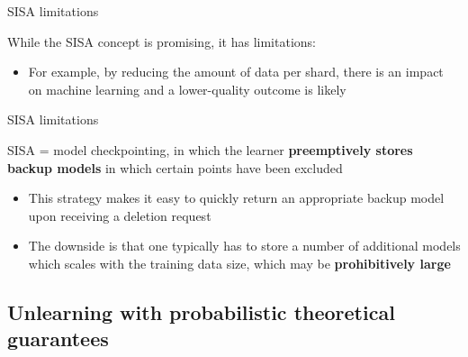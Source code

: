\documentclass[12pt,aspectratio=169,handout]{beamer}
\begin{document}
\begin{frame}{SISA limitations}

While the SISA concept is promising, it has limitations:

\begin{itemize}
\item For example, by reducing the amount of data per shard, there is an impact on machine learning and a lower-quality outcome is likely
\end{itemize}



\end{frame}



\begin{frame}{SISA limitations}


SISA = model checkpointing, in which the learner \textbf{preemptively stores backup models} in which certain points have been excluded

\begin{itemize}
\item This strategy makes it easy to quickly return an appropriate backup model upon receiving a deletion request
\item The downside is that one typically has to store a number of additional models which scales with the training data size, which may be \textbf{prohibitively large}
\end{itemize}




\end{frame}



\subsection{Unlearning with probabilistic theoretical guarantees}
\end{document}
